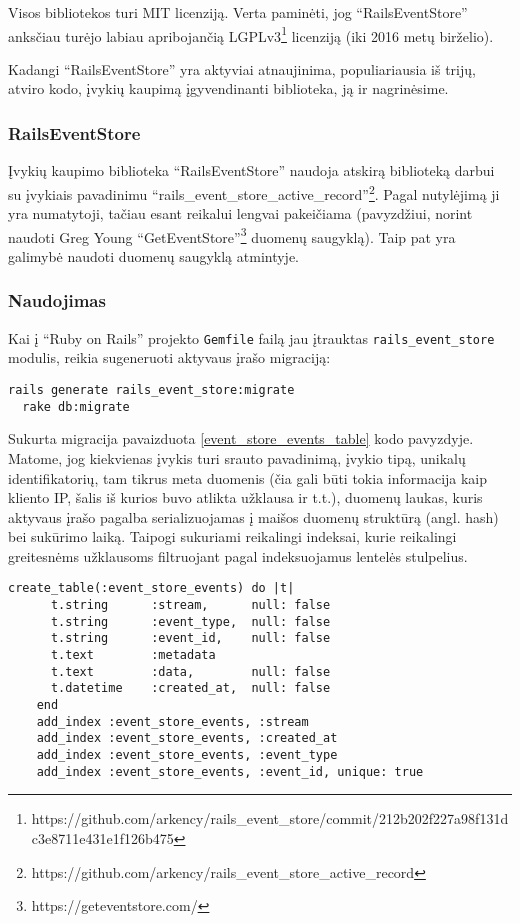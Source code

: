 Visos bibliotekos turi MIT licenziją. Verta paminėti, jog ``RailsEventStore'' anksčiau turėjo labiau apribojančią LGPLv3\footnote{https://github.com/arkency/rails\_event\_store/commit/212b202f227a98f131dc3e8711e431e1f126b475} licenziją (iki 2016 metų birželio).

Kadangi ``RailsEventStore'' yra aktyviai atnaujinima, populiariausia iš trijų, atviro kodo, įvykių kaupimą įgyvendinanti biblioteka, ją ir nagrinėsime.

\subsubsection{RailsEventStore}

Įvykių kaupimo biblioteka ``RailsEventStore'' naudoja atskirą biblioteką darbui su įvykiais pavadinimu ``rails\_event\_store\_active\_record''\footnote{https://github.com/arkency/rails\_event\_store\_active\_record}. Pagal nutylėjimą ji yra numatytoji, tačiau esant reikalui lengvai pakeičiama (pavyzdžiui, norint naudoti Greg Young ``GetEventStore''\footnote{https://geteventstore.com/} duomenų saugyklą). Taip pat yra galimybė naudoti duomenų saugyklą atmintyje.

\subsubsection{Naudojimas}

Kai į ``Ruby on Rails'' projekto \lstinline|Gemfile| failą jau įtrauktas \lstinline|rails_event_store| modulis, reikia sugeneruoti aktyvaus įrašo migraciją:

\begin{lstlisting}[]
  rails generate rails_event_store:migrate
  rake db:migrate
\end{lstlisting}

Sukurta migracija pavaizduota \ref{event_store_events_table} kodo pavyzdyje. Matome, jog kiekvienas įvykis turi srauto pavadinimą, įvykio tipą, unikalų identifikatorių, tam tikrus meta duomenis (čia gali būti tokia informacija kaip kliento IP, šalis iš kurios buvo atlikta užklausa ir t.t.), duomenų laukas, kuris aktyvaus įrašo pagalba serializuojamas į maišos duomenų struktūrą (angl. hash) bei sukūrimo laiką. Taipogi sukuriami reikalingi indeksai, kurie reikalingi greitesnėms užklausoms filtruojant pagal indeksuojamus lentelės stulpelius.

\begin{lstlisting}[caption=Įvykių saugojimo migracija, label=event_store_events_table]
    create_table(:event_store_events) do |t|
      t.string      :stream,      null: false
      t.string      :event_type,  null: false
      t.string      :event_id,    null: false
      t.text        :metadata
      t.text        :data,        null: false
      t.datetime    :created_at,  null: false
    end
    add_index :event_store_events, :stream
    add_index :event_store_events, :created_at
    add_index :event_store_events, :event_type
    add_index :event_store_events, :event_id, unique: true
\end{lstlisting}

